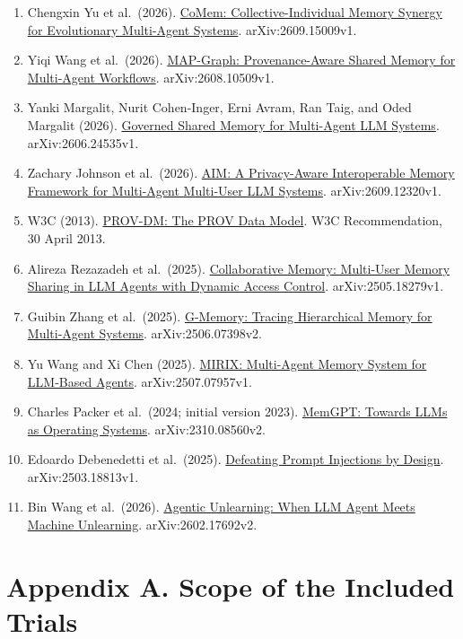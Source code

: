 \documentclass[10pt,a4paper]{article}
\newcommand{\tightlist}{\setlength{\itemsep}{1pt}\setlength{\parskip}{0pt}}
\begin{document}
\begin{enumerate}
\def\labelenumi{\arabic{enumi}.}
\tightlist
\item
  Chengxin Yu et al.~(2026). \href{https://arxiv.org/abs/2609.15009v1}{CoMem: Collective-Individual Memory Synergy for Evolutionary Multi-Agent Systems}. arXiv:2609.15009v1.
\item
  Yiqi Wang et al.~(2026). \href{https://arxiv.org/abs/2608.10509v1}{MAP-Graph: Provenance-Aware Shared Memory for Multi-Agent Workflows}. arXiv:2608.10509v1.
\item
  Yanki Margalit, Nurit Cohen-Inger, Erni Avram, Ran Taig, and Oded Margalit (2026). \href{https://arxiv.org/abs/2606.24535v1}{Governed Shared Memory for Multi-Agent LLM Systems}. arXiv:2606.24535v1.
\item
  Zachary Johnson et al.~(2026). \href{https://arxiv.org/abs/2609.12320v1}{AIM: A Privacy-Aware Interoperable Memory Framework for Multi-Agent Multi-User LLM Systems}. arXiv:2609.12320v1.
\item
  W3C (2013). \href{https://www.w3.org/TR/prov-dm/}{PROV-DM: The PROV Data Model}. W3C Recommendation, 30 April 2013.
\item
  Alireza Rezazadeh et al.~(2025). \href{https://arxiv.org/abs/2505.18279v1}{Collaborative Memory: Multi-User Memory Sharing in LLM Agents with Dynamic Access Control}. arXiv:2505.18279v1.
\item
  Guibin Zhang et al.~(2025). \href{https://arxiv.org/abs/2506.07398v2}{G-Memory: Tracing Hierarchical Memory for Multi-Agent Systems}. arXiv:2506.07398v2.
\item
  Yu Wang and Xi Chen (2025). \href{https://arxiv.org/abs/2507.07957v1}{MIRIX: Multi-Agent Memory System for LLM-Based Agents}. arXiv:2507.07957v1.
\item
  Charles Packer et al.~(2024; initial version 2023). \href{https://arxiv.org/abs/2310.08560v2}{MemGPT: Towards LLMs as Operating Systems}. arXiv:2310.08560v2.
\item
  Edoardo Debenedetti et al.~(2025). \href{https://arxiv.org/abs/2503.18813v1}{Defeating Prompt Injections by Design}. arXiv:2503.18813v1.
\item
  Bin Wang et al.~(2026). \href{https://arxiv.org/abs/2602.17692v2}{Agentic Unlearning: When LLM Agent Meets Machine Unlearning}. arXiv:2602.17692v2.
\end{enumerate}

\endgroup

\clearpage

\section{Appendix A. Scope of the Included Trials}\label{paper-01-appendix-a.-scope-of-the-included-trials}
\end{document}
